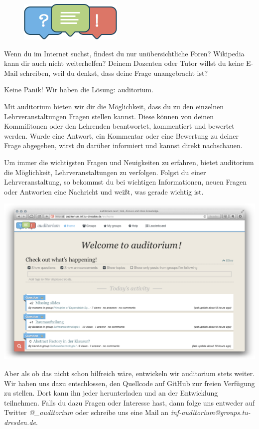 
\begin{figure}
\includegraphics[width=.95\linewidth]{img/auditorium_logo}
\end{figure}

Wenn du im Internet suchst, findest du nur unübersichtliche Foren?
Wikipedia kann dir auch nicht weiterhelfen?
Deinem Dozenten oder Tutor willst du keine E-Mail schreiben, weil du denkst, dass deine Frage unangebracht ist?

Keine Panik!
Wir haben die Lösung: auditorium.

Mit auditorium bieten wir dir die Möglichkeit, dass du zu den einzelnen Lehrveranstaltungen Fragen stellen kannst.
Diese können von deinen Kommilitonen oder den Lehrenden beantwortet, kommentiert und bewertet werden.
Wurde eine Antwort, ein Kommentar oder eine Bewertung zu deiner Frage abgegeben, wirst du darüber informiert und kannst direkt nachschauen.

Um immer die wichtigsten Fragen und Neuigkeiten zu erfahren, bietet auditorium die Möglichkeit, Lehrveranstaltungen zu verfolgen.
Folgst du einer Lehrveranstaltung, so bekommst du bei wichtigen Informationen, neuen Fragen oder Antworten eine Nachricht und weißt, was gerade wichtig ist.

{
\centering
\includegraphics[width=.75\linewidth]{img/auditorium.png}
\par
}

Aber als ob das nicht schon hilfreich wäre, entwickeln wir auditorium stets weiter.
Wir haben uns dazu entschlossen, den Quellcode auf GitHub  zur freien Verfügung zu stellen.
Dort kann ihn jeder herunterladen und an der Entwicklung teilnehmen.
Falls du dazu Fragen oder Interesse hast, dann folge uns entweder auf Twitter \textit{@\_auditorium} oder schreibe uns eine Mail an \textit{inf-auditorium@groups.tu-dresden.de}.
